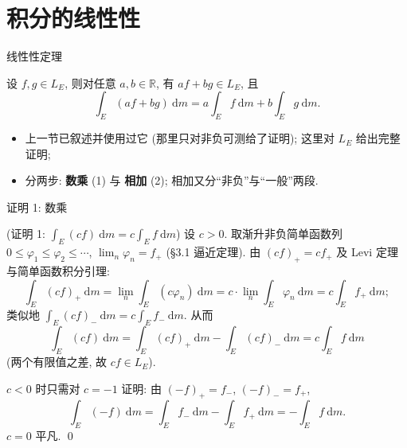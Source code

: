 
\section[线性性]{积分的线性性}


\begin{frame}{线性性定理}

\begin{thm}[线性性]
设 $f, g \in L_E$, 则对任意 $a, b \in \mathbb{R}$, 有 $af + bg \in L_E$, 且
\[
\int_E (af + bg) ~ \mathrm{d} m = a \int_E f ~ \mathrm{d} m + b \int_E g ~ \mathrm{d} m .
\]
\end{thm}

\pause

\begin{itemize}
\item 上一节已\alert{叙述}并使用过它 (那里只对非负可测给了证明); 这里对 $L_E$ 给出\alert{完整证明};
\item 分两步: \textbf{数乘} (1\textdegree) 与 \textbf{相加} (2\textdegree);
  相加又分``非负''与``一般''两段.
\end{itemize}

\end{frame}


\begin{frame}{证明 1\textdegree: 数乘}

\startproof[bg=yellow, fg=red](证明 1\textdegree: $\int_E (cf) ~ \mathrm{d} m = c \int_E f ~ \mathrm{d} m$)
设 $c > 0$. 取渐升非负简单函数列 $0 \leqslant \varphi_1 \leqslant \varphi_2 \leqslant \cdots$,
$\lim_n \varphi_n = f_+$ (\S 3.1 逼近定理). 由 $(c f)_+ = c f_+$ 及 Levi 定理与简单函数积分引理:
\[
\int_E (cf)_+ ~ \mathrm{d} m
= \lim_{n} \int_E (c \varphi_n) ~ \mathrm{d} m
= c \cdot \lim_n \int_E \varphi_n ~ \mathrm{d} m
= c \int_E f_+ ~ \mathrm{d} m ;
\]
类似地 $\int_E (cf)_- ~ \mathrm{d} m = c \int_E f_- ~ \mathrm{d} m$. 从而
\[
\int_E (cf) ~ \mathrm{d} m = \int_E (cf)_+ ~ \mathrm{d} m - \int_E (cf)_- ~ \mathrm{d} m
= c \int_E f ~ \mathrm{d} m
\]
(两个有限值之差, 故 $cf \in L_E$).

\pause

$c < 0$ 时只需对 $c = -1$ 证明: 由 $(−f)_+ = f_-$, $(−f)_- = f_+$,
\[
\int_E (-f) ~ \mathrm{d} m = \int_E f_- ~ \mathrm{d} m - \int_E f_+ ~ \mathrm{d} m = - \int_E f ~ \mathrm{d} m .
\]
$c = 0$ 平凡. \qed

\end{frame}

